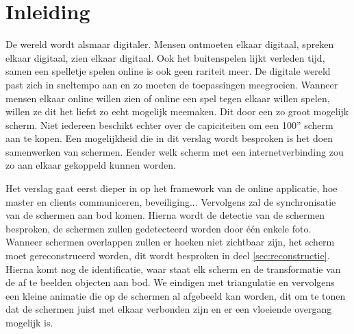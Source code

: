 \section{Inleiding}
De wereld wordt alsmaar digitaler. Mensen ontmoeten elkaar digitaal, spreken elkaar digitaal, zien elkaar digitaal. Ook het buitenspelen lijkt verleden tijd, samen een spelletje spelen online is ook geen rariteit meer. De digitale wereld past zich in sneltempo aan en zo moeten de toepassingen meegroeien. Wanneer mensen elkaar online willen zien of online een spel tegen elkaar willen spelen, willen ze dit het liefst zo echt mogelijk meemaken. Dit door een zo groot mogelijk scherm. Niet iedereen beschikt echter over de capiciteiten om een 100'' scherm aan te kopen. Een mogelijkheid die in dit verslag wordt besproken is het doen samenwerken van schermen. Eender welk scherm met een internetverbinding zou zo aan elkaar gekoppeld kunnen worden. 

Het verslag gaat eerst dieper in op het framework van de online applicatie, hoe master en clients communiceren, beveiliging... Vervolgens zal de synchronisatie van de schermen aan bod komen. Hierna wordt de detectie van de schermen besproken, de schermen zullen gedetecteerd worden door één enkele foto. Wanneer schermen overlappen zullen er hoeken niet zichtbaar zijn, het scherm moet gereconstrueerd worden, dit wordt besproken in deel \ref{sec:reconstructie}. Hierna komt nog de identificatie, waar staat elk scherm en de transformatie van de af te beelden objecten aan bod. We eindigen met triangulatie en vervolgens een kleine animatie die op de schermen al afgebeeld kan worden, dit om te tonen dat de schermen juist met elkaar verbonden zijn en er een vloeiende overgang mogelijk is.